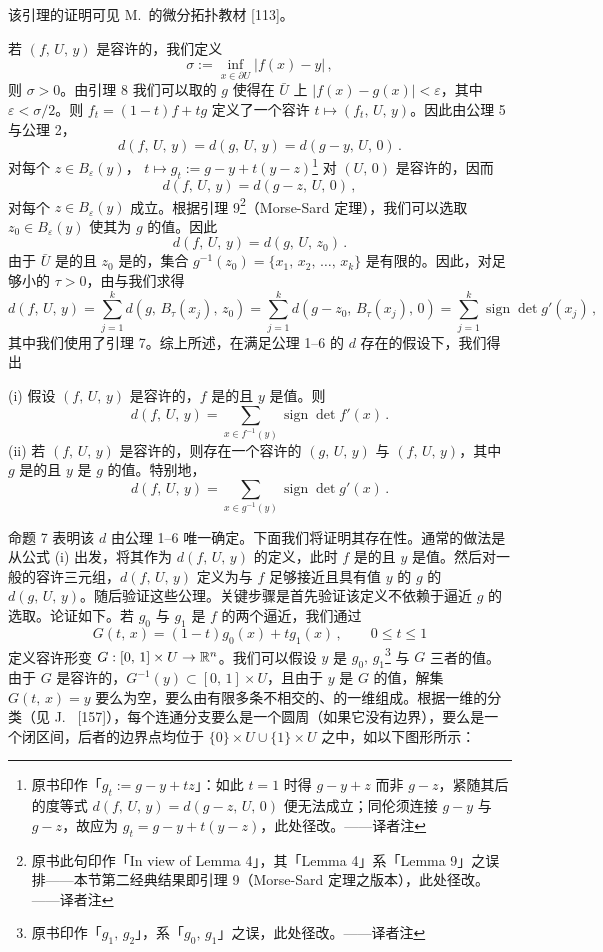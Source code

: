 该引理的证明可见 M.~\trHirsch{}的微分拓扑教材 [113]。

若 $(f,\,U,\,y)$ 是容许的，我们定义
\[\sigma :=\inf_{x\in\partial U}|f(x)-y|\,,\]
则 $\sigma>0$。由引理 8 我们可以取\trSmooth{}的 $g$ 使得在 $\bar{U}$ 上 $|f(x)-g(x)|<\varepsilon$，其中 $\varepsilon<\sigma/2$。则 $f_t=(1-t)f+tg$ 定义了一个容许\trHomotopy{} $t\mapsto (f_t,\,U,\,y)$。因此由公理 5 与公理 2，
\[d(f,\,U,\,y)=d(g,\,U,\,y)=d(g-y,\,U,\,0)\,.\]
对每个 $z\in B_{\varepsilon}(y)$，\trHomotopy{} $t\mapsto g_t:=g-y+t(y-z)$\footnote{原书印作「$g_t:=g-y+tz$」：如此 $t=1$ 时得 $g-y+z$ 而非 $g-z$，紧随其后的度等式 $d(f,\,U,\,y)=d(g-z,\,U,\,0)$ 便无法成立；同伦须连接 $g-y$ 与 $g-z$，故应为 $g_t=g-y+t(y-z)$，此处径改。——译者注} 对 $(U,\,0)$ 是容许的，因而
\[d(f,\,U,\,y)=d(g-z,\,U,\,0)\,,\]
对每个 $z\in B_{\varepsilon}(y)$ 成立。根据引理 9\footnote{原书此句印作「In view of Lemma 4」，其「Lemma 4」系「Lemma 9」之误排——本节第二经典结果即引理 9（Morse-Sard 定理之版本），此处径改。——译者注}（Morse-Sard 定理），我们可以选取 $z_0\in B_{\varepsilon}(y)$ 使其为 $g$ 的\trRegular{}值。因此
\[d(f,\,U,\,y)=d(g,\,U,\,z_0)\,.\]
由于 $\bar{U}$ 是\trCompact{}的且 $z_0$ 是\trRegular{}的，集合 $g^{-1}(z_0)=\{x_1,\,x_2,\,\ldots,\,x_k\}$ 是有限的。因此，对足够小的 $\tau>0$，由\trExcision{}与\trAdditivity{}我们求得
\[d(f,\,U,\,y)=\sum_{j=1}^{k}d(g,\,B_{\tau}(x_j),\,z_0)=\sum_{j=1}^{k}d(g-z_0,\,B_{\tau}(x_j),\,0)=\sum_{j=1}^{k}\operatorname{sign}\det g'(x_j)\,,\]
其中我们使用了引理 7。综上所述，在满足公理 1--6 的 $d$ 存在的假设下，我们得出

\begin{proposition}\label{prop:brouwer-degree-formula}
(i) 假设 $(f,\,U,\,y)$ 是容许的，$f$ 是\trSmooth{}的且 $y$ 是\trRegular{}值。则
\[d(f,\,U,\,y)=\sum_{x\in f^{-1}(y)}\operatorname{sign}\det f'(x)\,.\]
(ii) 若 $(f,\,U,\,y)$ 是容许的，则存在一个容许的 $(g,\,U,\,y)$ 与 $(f,\,U,\,y)$\trHomotopic{}，其中 $g$ 是\trSmooth{}的且 $y$ 是 $g$ 的\trRegular{}值。特别地，
\[d(f,\,U,\,y)=\sum_{x\in g^{-1}(y)}\operatorname{sign}\det g'(x)\,.\]
\end{proposition}

命题 7 表明该\trDegree{} $d$ 由公理 1--6 唯一确定。下面我们将证明其存在性。通常的做法是从公式 (i) 出发，将其作为 $d(f,\,U,\,y)$ 的定义，此时 $f$ 是\trSmooth{}的且 $y$ 是\trRegular{}值。然后对一般的容许三元组，$d(f,\,U,\,y)$ 定义为与 $f$ 足够接近且具有\trRegular{}值 $y$ 的\trSmooth{}\trMapping{} $g$ 的 $d(g,\,U,\,y)$。随后验证这些公理。关键步骤是首先验证该定义不依赖于逼近 $g$ 的选取。论证如下。若 $g_0$ 与 $g_1$ 是 $f$ 的两个\trSmooth{}逼近，我们通过
\[G(t,\,x)=(1-t)g_0(x)+tg_1(x)\,,\qquad 0\leq t\leq 1\]
定义容许形变 $G:[0,\,1]\times U\to\mathbb{R}^n$。我们可以假设 $y$ 是 $g_{0},\,g_{1}$\footnote{原书印作「$g_{1},\,g_{2}$」，系「$g_{0},\,g_{1}$」之误，此处径改。——译者注} 与 $G$ 三者的\trRegular{}值。由于 $G$ 是容许的，$G^{-1}(y)\subset[0,\,1]\times U$，且由于 $y$ 是 $G$ 的\trRegular{}值，解集 $G(t,\,x)=y$ 要么为空，要么由有限多条不相交的\trCompact{}、\trConnected{}的一维\trManifold{}组成。根据一维\trManifold{}的分类（见 J.~\trMilnor{} [157]），每个连通分支要么是一个圆周（如果它没有边界），要么是一个闭区间，后者的边界点均位于 $\{0\}\times U\cup\{1\}\times U$ 之中，如以下图形所示：

